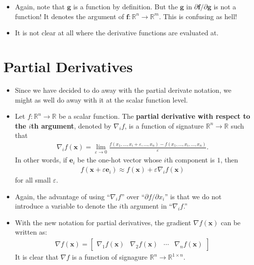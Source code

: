 \documentclass[10pt]{article}
\newcommand{\ve}[1]{\mathbf{#1}}
\newcommand{\Real}{\mathbb{R}}
\begin{document}
\begin{itemize}
\begin{itemize}
    \item Again, note that $\ve{g}$ is a function by definition. But the $\ve{g}$ in $\partial \ve{f} / \partial \ve{g}$ is not a function! It denotes the argument of $\ve{f}: \Real^n \rightarrow \Real^m$. This is confusing as hell!
    
    \item It is not clear at all where the derivative functions are evaluated at.
  \end{itemize}
\end{itemize}

\section{Partial Derivatives}

\begin{itemize}
  \item Since we have decided to do away with the partial derivate notation, we might as well do away with it at the scalar function level.
  
  \item Let $f: \Real^n \rightarrow \Real$ be a scalar function. The {\bf partial derivative with respect to the $i$th argument}, denoted by $\nabla_i f$, is a function of signature $\Real^n \rightarrow \Real$ such that
  \begin{align*}
    \nabla_i f(\ve{x}) = \lim_{\varepsilon \rightarrow 0} \frac{f(x_1, \dotsc, x_i+\varepsilon, \dotsc, x_n) - f(x_1, \dotsc, x_i, \dotsc, x_n)}{\varepsilon}.
  \end{align*} 
  In other words, if $\ve{e}_i$ be the one-hot vector whose $i$th component is $1$, then
  \begin{align*}
    f(\ve{x} + \varepsilon \ve{e}_i) \approx f(\ve{x}) + \varepsilon \nabla_i f(\ve{x})
  \end{align*}
  for all small $\varepsilon$.

  \item Again, the advantage of using ``$\nabla_i f$'' over ``$\partial f / \partial x_i$'' is that we do not introduce a variable to denote the $i$th argument in ``$\nabla_i f$.''
  
  \item With the new notation for partial derivatives, the gradient $\nabla f(\ve{x})$ can be written as:
  \begin{align*}
    \nabla f(\ve{x}) 
    = \begin{bmatrix}
      \nabla_1 f(\ve{x}) &
      \nabla_2 f(\ve{x}) &
      \cdots &
      \nabla_n f(\ve{x})
    \end{bmatrix}
  \end{align*}
  It is clear that $\nabla f$ is a function of signagure $\Real^n \rightarrow \Real^{1 \times n}$.


\end{itemize}
\end{document}
